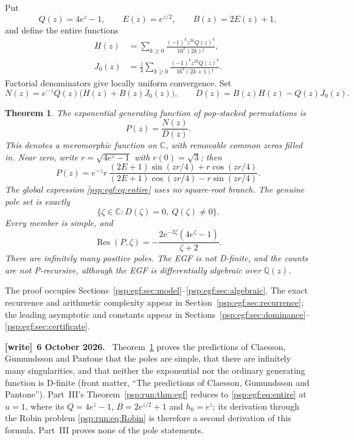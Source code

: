 \documentclass[11pt,letterpaper]{article}
\numberwithin{equation}{section}
\newtheorem{theorem}{Theorem}[section]
\theoremstyle{remark}\newtheorem{remark}[theorem]{Remark}
\newcommand{\CC}{\mathbb C}
\newcommand{\Res}{\operatorname{Res}}
\newenvironment{writenote}[1][]{\par\smallskip\begingroup\small
 \noindent\textbf{[write]}\if\relax\detokenize{#1}\relax\else~\textbf{#1.}\fi\ }%
 {\par\endgroup\smallskip}
\begin{document}
Put
\[
 Q(z)=4e^z-1,\qquad E(z)=e^{z/2},\qquad B(z)=2E(z)+1,
\]
and define the entire functions
\begin{align}
 H(z)&=\sum_{k\geq0}\frac{(-1)^kz^{2k}Q(z)^k}{16^k(2k)!},\label{psp:egf:eq:H}\\
 J_0(z)&=\frac z4\sum_{k\geq0}\frac{(-1)^kz^{2k}Q(z)^k}{16^k(2k+1)!}.
 \label{psp:egf:eq:J}
\end{align}
Factorial denominators give locally uniform convergence. Set
\begin{equation}\label{psp:egf:eq:ND}
 N(z)=e^{-z}Q(z)\bigl(H(z)+B(z)J_0(z)\bigr),\qquad
 D(z)=B(z)H(z)-Q(z)J_0(z).
\end{equation}
\begin{theorem}\label{psp:egf:thm:main}
The exponential generating function of pop-stacked permutations is
\begin{equation}\label{psp:egf:eq:entire}
 \boxed{P(z)=\frac{N(z)}{D(z)}}.
\end{equation}
This denotes a meromorphic function on $\CC$, with removable common zeros
filled in. Near zero, write $r=\sqrt{4e^z-1}$ with $r(0)=\sqrt3$; then
\begin{equation}\label{psp:egf:eq:trig}
 P(z)=e^{-z}r\,
 \frac{(2E+1)\sin(zr/4)+r\cos(zr/4)}
      {(2E+1)\cos(zr/4)-r\sin(zr/4)}.
\end{equation}
The global expression \eqref{psp:egf:eq:entire} uses no square-root branch.
The genuine pole set is exactly
\begin{equation}\label{psp:egf:eq:poleset}
 \{\zeta\in\CC:D(\zeta)=0,\ Q(\zeta)\ne0\}.
\end{equation}
Every member is simple, and
\begin{equation}\label{psp:egf:eq:residue}
 \Res(P,\zeta)=-\frac{2e^{-2\zeta}(4e^\zeta-1)}{\zeta+2}.
\end{equation}
There are infinitely many positive poles. The EGF is not D-finite, and
the counts are not P-recursive, although the EGF is differentially
algebraic over $\mathbb Q(z)$.
\end{theorem}
The proof occupies Sections~\ref{psp:egf:sec:model}--\ref{psp:egf:sec:algebraic}.
The exact recurrence and arithmetic complexity appear in
Section~\ref{psp:egf:sec:recurrence}; the leading asymptotic and constants appear
in Sections~\ref{psp:egf:sec:dominance}--\ref{psp:egf:sec:certificate}.
\begin{writenote}[6 October 2026]
Theorem~\ref{psp:egf:thm:main} proves the predictions of Claesson, Gu\dh mundsson and Pantone \cite[Section~3.3]{cgp} that the poles are simple, that there are infinitely many singularities, and that neither the exponential nor the ordinary generating function is D-finite (front matter, ``The predictions of Claesson, Gu\dh mundsson and Pantone''). Part~III's Theorem~\ref{psp:run:thm:egf} reduces to \eqref{psp:egf:eq:entire} at $u=1$, where its $Q=4e^z-1$, $B=2e^{z/2}+1$ and $h_0=e^z$; its derivation through the Robin problem \eqref{psp:run:eq:Robin} is therefore a second derivation of this formula. Part~III proves none of the pole statements.
\end{writenote}
\end{document}
